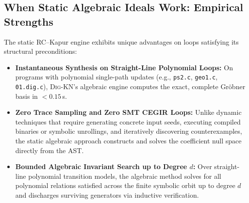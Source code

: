 \documentclass[runningheads]{llncs}
\newcommand{\tool}{\textsc{Dig-KN}\xspace}
\newcommand{\code}[1]{\texttt{\small #1}}
\begin{document}
\subsection{When Static Algebraic Ideals Work: Empirical Strengths}
The static RC--Kapur engine exhibits unique advantages on loops satisfying its structural preconditions:
\begin{itemize}[leftmargin=1.5em]
\item \textbf{Instantaneous Synthesis on Straight-Line Polynomial Loops:} On programs with polynomial single-path updates (e.g., \code{ps2.c}, \code{geo1.c}, \code{01.dig.c}), \tool{}'s algebraic engine computes the exact, complete Gr\"obner basis in $<0.15$\,s.
\item \textbf{Zero Trace Sampling and Zero SMT CEGIR Loops:} Unlike dynamic techniques that require generating concrete input seeds, executing compiled binaries or symbolic unrollings, and iteratively discovering counterexamples, the static algebraic approach constructs and solves the coefficient null space directly from the AST.
\item \textbf{Bounded Algebraic Invariant Search up to Degree $d$:} Over straight-line polynomial transition models, the algebraic method solves for all polynomial relations satisfied across the finite symbolic orbit up to degree $d$ and discharges surviving generators via inductive verification.
\end{itemize}
\end{document}
